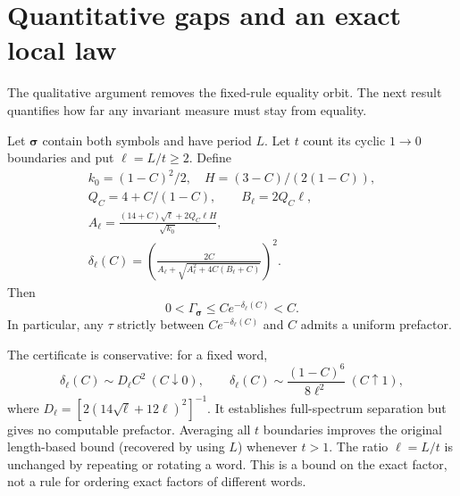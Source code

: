 \documentclass[letterpaper,twoside]{article}
\begin{document}
\section{Quantitative gaps and an exact local law}\label{sec:gap}
The qualitative argument removes the fixed-rule equality orbit. The next result quantifies how far any invariant measure must stay from equality.

\begin{theorem}\label{thm:quant}
Let $\bm\sigma$ contain both symbols and have period $L$. Let $t$ count its cyclic $1\to0$ boundaries and put $\ell=L/t\ge2$. Define
\begin{gather*}
 k_0=(1-C)^2/2,\quad H=(3-C)/(2(1-C)),\\
 Q_C=4+C/(1-C),\qquad B_\ell=2Q_C\ell,\\
 A_\ell=\frac{(14+C)\sqrt\ell+2Q_C\ell H}{\sqrt{k_0}},\\
 \delta_\ell(C)=\left(
 \frac{2C}{A_\ell+\sqrt{A_\ell^2+4C(B_\ell+C)}}\right)^2.
\end{gather*}
Then
\begin{equation}\label{eq:quant}
 0<\Gamma_{\bm\sigma}\le Ce^{-\delta_\ell(C)}<C.
\end{equation}
In particular, any $\tau$ strictly between $Ce^{-\delta_\ell(C)}$ and $C$ admits a uniform prefactor.
\end{theorem}

The certificate is conservative: for a fixed word,
\begin{equation}\label{eq:delta-regimes}
 \delta_\ell(C)\sim D_\ell C^2\ (C\downarrow0),\qquad
 \delta_\ell(C)\sim\frac{(1-C)^6}{8\ell^2}\ (C\uparrow1),
\end{equation}
where $D_\ell=[2(14\sqrt\ell+12\ell)^2]^{-1}$. It establishes full-spectrum separation but gives no computable prefactor. Averaging all $t$ boundaries improves the original length-based bound (recovered by using $L$) whenever $t>1$. The ratio $\ell=L/t$ is unchanged by repeating or rotating a word. This is a bound on the exact factor, not a rule for ordering exact factors of different words.
\end{document}
